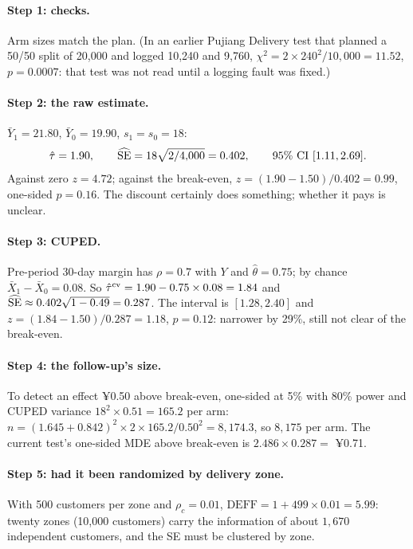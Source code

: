 \documentclass[11pt]{article}
\begin{document}
\paragraph{Step 1: checks.} Arm sizes match the plan. (In an earlier Pujiang Delivery test that planned a 50/50 split
of 20{,}000 and logged 10{,}240 and 9{,}760, $\chi^2 = 2 \times 240^2/10{,}000 = 11.52$, $p = 0.0007$: that test
was not read until a logging fault was fixed.)

\paragraph{Step 2: the raw estimate.} $\bar Y_1 = 21.80$, $\bar Y_0 = 19.90$, $s_1 = s_0 = 18$:
\[
  \hat{\tau} = 1.90, \qquad \widehat{\operatorname{SE}} = 18\sqrt{2/4{,}000} = 0.402, \qquad \text{95\% CI } [1.11, 2.69].
\]
Against zero $z = 4.72$; against the break-even, $z = (1.90 - 1.50)/0.402 = 0.99$, one-sided $p = 0.16$. The
discount certainly does something; whether it pays is unclear.

\paragraph{Step 3: CUPED.} Pre-period 30-day margin has $\rho = 0.7$ with $Y$ and $\hat\theta = 0.75$; by chance
$\bar X_1 - \bar X_0 = 0.08$. So $\hat{\tau}^{\text{cv}} = 1.90 - 0.75 \times 0.08 = 1.84$ and
$\widehat{\operatorname{SE}} \approx 0.402\sqrt{1 - 0.49} = 0.287$. The interval is $[1.28, 2.40]$ and $z = (1.84 - 1.50)/0.287 = 1.18$,
$p = 0.12$: narrower by 29\%, still not clear of the break-even.

\paragraph{Step 4: the follow-up's size.} To detect an effect ¥0.50 above break-even, one-sided at 5\% with
80\% power and CUPED variance $18^2 \times 0.51 = 165.2$ per arm:
$n = (1.645 + 0.842)^2 \times 2 \times 165.2/0.50^2 = 8{,}174.3$, so $8{,}175$ per arm. The current test's one-sided MDE above
break-even is $2.486 \times 0.287 = $ ¥0.71.

\paragraph{Step 5: had it been randomized by delivery zone.} With 500 customers per zone and $\rho_c = 0.01$,
$\text{DEFF} = 1 + 499 \times 0.01 = 5.99$: twenty zones (10{,}000 customers) carry the information of about
$1{,}670$ independent customers, and the SE must be clustered by zone.
\end{document}
